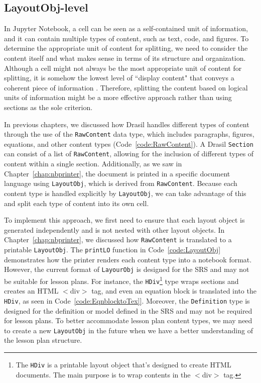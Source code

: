 \subsection{LayoutObj-level}
In Jupyter Notebook, a cell can be seen as a self-contained unit of 
information, and it can contain multiple types of content, such as text, code, 
and figures. To determine the appropriate unit of content for splitting, we 
need to consider the content itself and what makes sense in terms of its 
structure and organization.  Although a cell might not always be the most 
appropriate unit of content for splitting, it is somehow the lowest level of 
``display content" that conveys a coherent piece of information 
\cite{cellsseparation}. Therefore, splitting the content based on logical units 
of information might be a more effective approach rather than using sections as 
the sole criterion. 

In previous chapters, we discussed how Drasil handles different types of 
content through the use of the \texttt{RawContent} data type, which includes 
paragraphs, figures, equations, and other content types 
(Code~\ref{code:RawContent}). A Drasil \texttt{Section} can consist of a list 
of \texttt{RawContent}, allowing for the inclusion of different types of 
content within a single section. Additionally, as we saw in 
Chapter~\ref{chap:nbprinter}, the document is printed in a specific document 
language using \texttt{LayoutObj}, which is derived from \texttt{RawContent}. 
Because each content type is handled explicitly by \texttt{LayoutObj}, we can 
take advantage of this and split each type of content into its own cell.

To implement this approach, we first need to ensure that each layout object 
is generated independently and is not nested with other layout objects. In 
Chapter~\ref{chap:nbprinter}, we discussed how \texttt{RawContent} is 
translated to a printable \texttt{LayoutObj}. The \texttt{printLO} function in 
Code~\ref{code:LayoutObj} demonstrates how the printer renders each content 
type into a notebook format. However, the current format of \texttt{LayourObj} 
is designed for the SRS and may not be suitable for lesson plans. For instance, 
the \texttt{HDiv}\footnote{The \texttt{HDiv} is a printable layout object 
that's designed to create HTML documents. The main purpose is to wrap contents 
in the $<$div$>$ tag.} type wraps sections and creates an HTML $<$div$>$ tag, 
and even an equation block is translated into the \texttt{HDiv}, 
as seen in Code~\ref{code:EqnblocktoTex]}. Moreover, the \texttt{Definition} 
type is designed for the definition or model defined in the SRS and may not be 
required for lesson plans. To better accommodate lesson plan content types, we 
may need to create a new \texttt{LayoutObj} in the future when we have a 
better understanding of the lesson plan structure.

